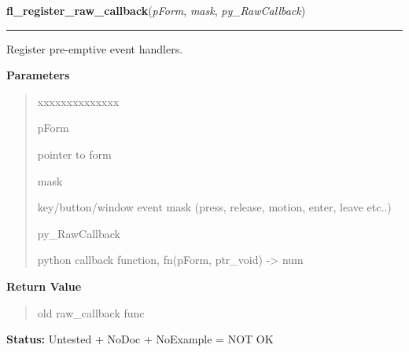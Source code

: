 \hspace{.8\funcindent}\begin{boxedminipage}{\funcwidth}

    \raggedright \textbf{fl\_register\_raw\_callback}(\textit{pForm}, \textit{mask}, \textit{py\_RawCallback})

    \vspace{-1.5ex}

    \rule{\textwidth}{0.5\fboxrule}
\setlength{\parskip}{2ex}
    Register pre-emptive event handlers.

\setlength{\parskip}{1ex}
      \textbf{Parameters}
      \vspace{-1ex}

      \begin{quote}
        \begin{Ventry}{xxxxxxxxxxxxxx}

          \item[pForm]

          pointer to form

          \item[mask]

          key/button/window event mask (press, release, motion, enter, 
          leave etc..)

          \item[py\_RawCallback]

          python callback function, fn(pForm, ptr\_void) -{\textgreater} 
          num

        \end{Ventry}

      \end{quote}

      \textbf{Return Value}
    \vspace{-1ex}

      \begin{quote}
      old raw\_callback func

      \end{quote}

\textbf{Status:} Untested + NoDoc + NoExample = NOT OK



    \end{boxedminipage}

    \label{xformslib:library:fl_register_raw_callback}

    \vspace{0.5ex}

